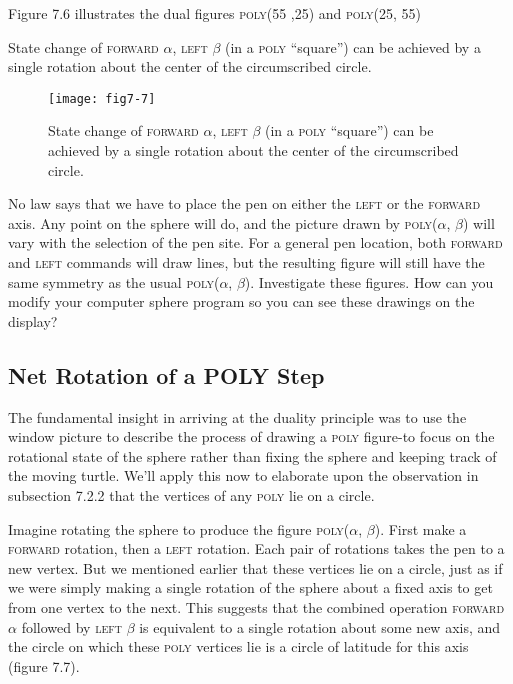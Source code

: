 \documentclass{book}
\begin{document}
Figure 7.6 illustrates the dual figures \textsc{poly}(55 ,25) and \textsc{poly}(25, 55)

State change of \textsc{forward} $\alpha$, \textsc{left} $\beta$ (in a \textsc{poly} ``square'') can be achieved by a single
rotation about the center of the circumscribed circle.

\begin{figure}
\begin{center}
\texttt{[image: fig7-7]}
\caption{State change of \textsc{forward} $\alpha$, \textsc{left} $\beta$ (in a \textsc{poly} ``square'') can be achieved by a single rotation about the center of the circumscribed circle.}
\end{center}
\end{figure}

No law says that we have to place the pen on either the \textsc{left} or
the \textsc{forward} axis. Any point on the sphere will do, and the picture
drawn by \textsc{poly}($\alpha$, $\beta$) will vary with the selection of the pen site. For
a general pen location, both \textsc{forward} and \textsc{left} commands will draw
lines, but the resulting figure will still have the same symmetry as the
usual \textsc{poly}($\alpha$, $\beta$). Investigate these figures. How can you modify your
computer sphere program so you can see these drawings on the display?

\subsection{Net Rotation of a POLY Step}

The fundamental insight in arriving at the duality principle was to use
the window picture to describe the process of drawing a \textsc{poly} figure-to
focus on the rotational state of the sphere rather than fixing the sphere
and keeping track of the moving turtle. We'll apply this now to elaborate
upon the observation in subsection 7.2.2 that the vertices of any \textsc{poly}
lie on a circle.

Imagine rotating the sphere to produce the figure \textsc{poly}($\alpha$, $\beta$). First
make a \textsc{forward} rotation, then a \textsc{left} rotation. Each pair of rotations
takes the pen to a new vertex. But we mentioned earlier that these
vertices lie on a circle, just as if we were simply making a single rotation
of the sphere about a fixed axis to get from one vertex to the next. This
suggests that the combined operation \textsc{forward} $\alpha$ followed by \textsc{left} $\beta$ is
equivalent to a single rotation about some new axis, and the circle on
which these \textsc{poly} vertices lie is a circle of latitude for this axis (figure
7.7).
\end{document}
